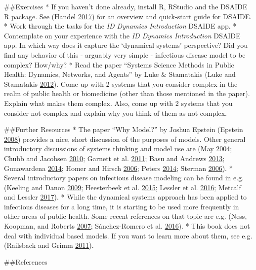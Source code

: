 \documentclass[]{book}
\theoremstyle{definition}
\theoremstyle{definition}
\theoremstyle{definition}
\theoremstyle{remark}
\begin{document}
\#\#Exercises * If you haven't done already, install R, RStudio and the
DSAIDE R package. See (Handel \protect\hyperlink{ref-handel17}{2017})
for an overview and quick-start guide for DSAIDE. * Work through the
tasks for the \emph{ID Dynamics Introduction} DSAIDE app. * Contemplate
on your experience with the \emph{ID Dynamics Introduction} DSAIDE app.
In which way does it capture the `dynamical systems' perspective? Did
you find any behavior of this - arguably very simple - infectious
disease model to be complex? How/why? * Read the paper ``Systems Science
Methods in Public Health: Dynamics, Networks, and Agents'' by Luke \&
Stamatakis (Luke and Stamatakis \protect\hyperlink{ref-luke12}{2012}).
Come up with 2 systems that you consider complex in the realm of public
health or biomedicine (other than those mentioned in the paper). Explain
what makes them complex. Also, come up with 2 systems that you consider
not complex and explain why you think of them as not complex.

\#\#Further Resources * The paper ``Why Model?'' by Joshua Epstein
(Epstein \protect\hyperlink{ref-epstein08}{2008}) provides a nice, short
discussion of the purposes of models. Other general introductory
discussions of systems thinking and model use are (May
\protect\hyperlink{ref-may04}{2004}; Chubb and Jacobsen
\protect\hyperlink{ref-chubb10}{2010}; Garnett et al.
\protect\hyperlink{ref-garnett11}{2011}; Basu and Andrews
\protect\hyperlink{ref-basu13}{2013}; Gunawardena
\protect\hyperlink{ref-gunawardena14}{2014}; Homer and Hirsch
\protect\hyperlink{ref-homer06}{2006}; Peters
\protect\hyperlink{ref-peters14}{2014}; Sterman
\protect\hyperlink{ref-sterman06}{2006}). * Several introductory papers
on infectious disease modeling can be found in e.g. (Keeling and Danon
\protect\hyperlink{ref-keeling09}{2009}; Heesterbeek et al.
\protect\hyperlink{ref-heesterbeek15}{2015}; Lessler et al.
\protect\hyperlink{ref-lessler16}{2016}; Metcalf and Lessler
\protect\hyperlink{ref-metcalf17}{2017}). * While the dynamical systems
approach has been applied to infectious diseases for a long time, it is
starting to be used more frequently in other areas of public health.
Some recent references on that topic are e.g. (Ness, Koopman, and
Roberts \protect\hyperlink{ref-ness07}{2007}; Sánchez-Romero et al.
\protect\hyperlink{ref-sanchez-romero16}{2016}). * This book does not
deal with individual based models. If you want to learn more about them,
see e.g. (Railsback and Grimm
\protect\hyperlink{ref-railsback11}{2011}).

\#\#References
\end{document}
